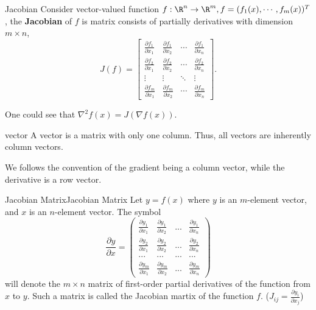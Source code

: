 \begin{definition}{Jacobian}{}
    Consider vector-valued function $f:\R^n\to \R^m,f=(f_1(x),\cdots,f_m(x))^T$, the \textbf{Jacobian} of $f$ is matrix consists of partially derivatives with dimension $m\times n$,
 \begin{equation*}
     J(f) = \begin{bmatrix}
            \frac{\partial f_1}{\partial x_1}&\frac{\partial f_1}{\partial x_2}&\cdots&\frac{\partial f_1}{\partial x_n}\\
             \frac{\partial f_2}{\partial x_1}&\frac{\partial f_2}{\partial x_2}&\cdots&\frac{\partial f_2}{\partial x_n}\\
            \vdots&\vdots&\ddots&\vdots\\
             \frac{\partial f_m}{\partial x_1}&\frac{\partial f_m}{\partial x_2}&\cdots&\frac{\partial f_m}{\partial x_n}
        \end{bmatrix}.
 \end{equation*}
\end{definition}
\begin{remark}
    One could see that $\nabla^2 f(x) = J(\nabla f(x))$.
\end{remark}



\begin{definition}{vector}{}
    A vector is a matrix with only one column. Thus, all vectors are inherently column vectors. 
\end{definition}

\begin{remark}
    We follows the convention of the gradient being a column vector, while the derivative is a row vector. 
\end{remark}

\begin{definition}{Jacobian Matrix}{Jacobian Matrix}
    Let $y=f(x)$ where $y$ is an $m$-element vector, and $x$ is an $n$-element vector. The symbol
    \begin{equation}\label{eq:Jacobian Matrix}
        \frac{\partial y}{\partial x} 
        = \begin{pmatrix}
            \frac{\partial y_1}{\partial x_1}& \frac{\partial y_1}{\partial x_2} & ... & \frac{\partial y_1}{\partial x_n}\\
            \frac{\partial y_2}{\partial x_1}& \frac{\partial y_2}{\partial x_2} & ... & \frac{\partial y_2}{\partial x_n}\\
            ...& ... & ... & ...\\
            \frac{\partial y_m}{\partial x_1}& \frac{\partial y_m}{\partial x_2} & ... & \frac{\partial y_m}{\partial x_n}
        \end{pmatrix}
    \end{equation}
    will denote the $m\times n$ matrix of first-order partial derivatives of the function from $x$ to $y$. Such a matrix is called the Jacobian martix of the function $f$. ($J_{ij}=\frac{\partial y_i}{\partial x_j}$)
\end{definition}

